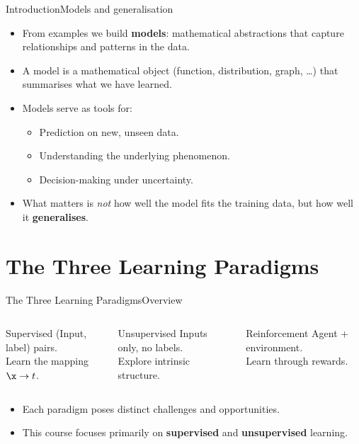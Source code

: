 \begin{frame}{Introduction}{Models and generalisation}
  \begin{itemize}
    \item From examples we build \textbf{models}: mathematical abstractions that capture
          relationships and patterns in the data.
    \item A model is a mathematical object (function, distribution, graph, \ldots) that
          summarises what we have learned.
    \item Models serve as tools for:
      \begin{itemize}
        \item Prediction on new, unseen data.
        \item Understanding the underlying phenomenon.
        \item Decision-making under uncertainty.
      \end{itemize}
    \item What matters is \emph{not} how well the model fits the training data,
          but how well it \textbf{generalises}.
  \end{itemize}
\end{frame}

\section{The Three Learning Paradigms}

\begin{frame}{The Three Learning Paradigms}{Overview}
  \begin{columns}[T]
    \begin{block}{Supervised}
      (Input, label) pairs.\\
      Learn the mapping $\x \to t$.
    \end{block}
    \begin{block}{Unsupervised}
      Inputs only, no labels.\\
      Explore intrinsic structure.
    \end{block}
    \begin{block}{Reinforcement}
      Agent + environment.\\
      Learn through rewards.
    \end{block}
  \end{columns}
  \bigskip
  \begin{itemize}
    \item Each paradigm poses distinct challenges and opportunities.
    \item This course focuses primarily on \textbf{supervised} and \textbf{unsupervised}
          learning.
  \end{itemize}
\end{frame}

